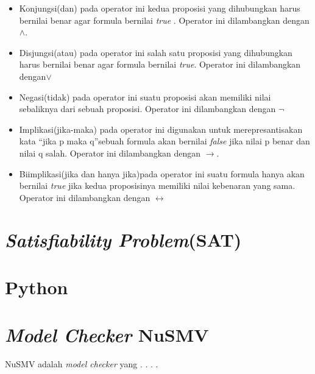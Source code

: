 \begin{itemize}
	\item Konjungsi(dan) pada operator ini kedua proposisi yang dihubungkan harus bernilai benar agar formula bernilai \textit{true}
	. Operator ini dilambangkan dengan $\wedge$.
	\item Disjungsi(atau) pada operator ini salah satu proposisi yang dihubungkan harus bernilai benar agar formula bernilai \textit{true}. Operator ini dilambangkan dengan$\lor$ 
	\item Negasi(tidak) pada operator ini suatu proposisi akan memiliki nilai sebaliknya dari sebuah proposisi. Operator ini dilambangkan dengan $\neg$
	\item Implikasi(jika-maka) pada operator ini digunakan untuk merepresantisakan kata \textquotedblleft jika p maka q\textquotedblright sebuah formula akan bernilai \textit{false} jika nilai p benar dan nilai q salah. Operator ini dilambangkan dengan $\to$. 
	\item Biimplikasi(jika dan hanya jika)pada operator ini suatu formula hanya akan bernilai \textit{true} jika kedua proposisinya memiliki nilai kebenaran yang sama. Operator ini dilambangkan dengan $\leftrightarrow$
	
\end{itemize}

\section{\textit{Satisfiability Problem}(SAT)}

\section{Python}

\section{\textit{Model Checker} NuSMV}

NuSMV adalah \textit{model checker} yang . . . .

